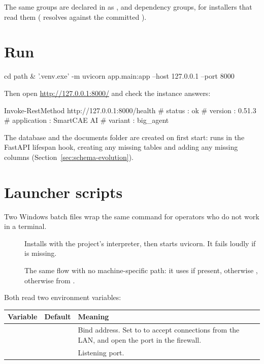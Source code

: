 The same groups are declared in  as ,
 and  dependency groups, for installers that read them
( resolves against the committed ).

\section{Run}

\begin{shellblock}
cd path\to\ucak
& '.venv\Scripts\python.exe' -m uvicorn app.main:app --host 127.0.0.1 --port 8000
\end{shellblock}

Then open \url{http://127.0.0.1:8000/} and check the instance answers:

\begin{shellblock}
Invoke-RestMethod http://127.0.0.1:8000/health
# status      : ok
# version     : 0.51.3
# application : SmartCAE AI
# variant     : big_agent
\end{shellblock}

The database and the documents folder are created on first start:
 runs in the FastAPI lifespan hook, creating any missing tables
and adding any missing columns (Section~\ref{sec:schema-evolution}).

\section{Launcher scripts}

Two Windows batch files wrap the same command for operators who do not work in a
terminal.

\begin{description}
\item[] Installs  with the project's
 interpreter, then starts uvicorn. It fails loudly if
 is missing.

\item[] The same flow with no machine-specific path: it
uses  if present, otherwise , otherwise  from
.
\end{description}

Both read two environment variables:

\begin{longtable}{L{0.20\textwidth} L{0.16\textwidth} L{0.52\textwidth}}
\toprule
\textbf{Variable} & \textbf{Default} & \textbf{Meaning} \\
\midrule
\endfirsthead
\bottomrule
\endfoot
{} &  & Bind address. Set to  to
accept connections from the LAN, and open the port in the firewall. \\
 &  & Listening port. \\
\end{longtable}

